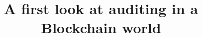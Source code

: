 \documentclass[envcountsect]{llncs}
\begin{document}
\frontmatter
\mainmatter

\title{\Large \bf A first look at auditing in a Blockchain world}

%

\maketitle












\clearpage
\appendix
\end{document}
